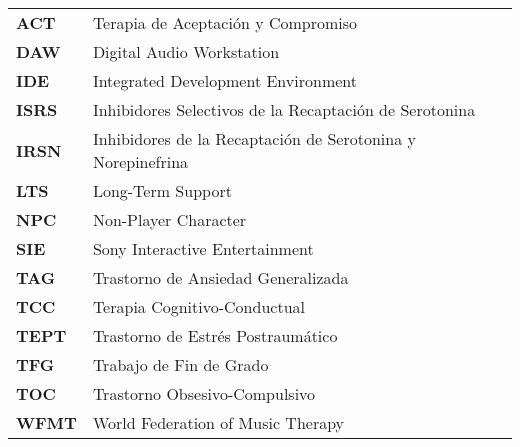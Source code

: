 
\renewcommand{\arraystretch}{1.5}



\begin{longtable}{l p{13.7cm}}

\textbf{ACT} & Terapia de Aceptación y Compromiso \\	
\textbf{DAW} & Digital Audio Workstation \\
\textbf{IDE} & Integrated Development Environment \\
\textbf{ISRS} & Inhibidores Selectivos de la Recaptación de Serotonina \\
\textbf{IRSN} & Inhibidores de la Recaptación de Serotonina y Norepinefrina \\
\textbf{LTS} & Long-Term Support \\
\textbf{NPC} & Non-Player Character \\
\textbf{SIE} & Sony Interactive Entertainment \\
\textbf{TAG} & Trastorno de Ansiedad Generalizada \\
\textbf{TCC} & Terapia Cognitivo-Conductual \\
\textbf{TEPT} & Trastorno de Estrés Postraumático \\
\textbf{TFG} & Trabajo de Fin de Grado \\
\textbf{TOC} & Trastorno Obsesivo-Compulsivo \\
\textbf{WFMT} & World Federation of Music Therapy \\

\end{longtable}
